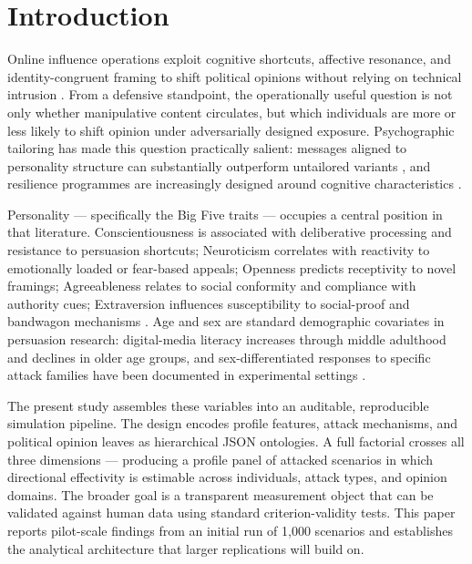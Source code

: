 \documentclass[11pt,a4paper]{article}
\begin{document}
\vspace{1em}

\clearpage
\section{Introduction}

Online influence operations exploit cognitive shortcuts, affective resonance, and identity-congruent framing to shift political opinions without relying on technical intrusion \citep{bennett2018disinformation,lazer2018science,lewandowsky2017posttruth}. From a defensive standpoint, the operationally useful question is not only whether manipulative content circulates, but which individuals are more or less likely to shift opinion under adversarially designed exposure. Psychographic tailoring has made this question practically salient: messages aligned to personality structure can substantially outperform untailored variants \citep{matz2017psychological}, and resilience programmes are increasingly designed around cognitive characteristics \citep{kozyreva2020citizens,roozenbeek2022psychological,pennycook2021psychology}.

Personality --- specifically the Big Five traits --- occupies a central position in that literature. Conscientiousness is associated with deliberative processing and resistance to persuasion shortcuts; Neuroticism correlates with reactivity to emotionally loaded or fear-based appeals; Openness predicts receptivity to novel framings; Agreeableness relates to social conformity and compliance with authority cues; Extraversion influences susceptibility to social-proof and bandwagon mechanisms \citep{pennycook2019lazy,pennycook2021psychology}. Age and sex are standard demographic covariates in persuasion research: digital-media literacy increases through middle adulthood and declines in older age groups, and sex-differentiated responses to specific attack families have been documented in experimental settings \citep{kozyreva2020citizens}.

The present study assembles these variables into an auditable, reproducible simulation pipeline. The design encodes profile features, attack mechanisms, and political opinion leaves as hierarchical JSON ontologies. A full factorial crosses all three dimensions --- producing a profile panel of attacked scenarios in which directional effectivity is estimable across individuals, attack types, and opinion domains. The broader goal is a transparent measurement object that can be validated against human data using standard criterion-validity tests. This paper reports pilot-scale findings from an initial run of 1{,}000 scenarios and establishes the analytical architecture that larger replications will build on.
\end{document}
